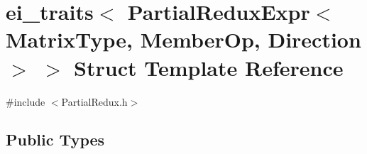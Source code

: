 \hypertarget{structei__traits_3_01_partial_redux_expr_3_01_matrix_type_00_01_member_op_00_01_direction_01_4_01_4}{\section{ei\-\_\-traits$<$ Partial\-Redux\-Expr$<$ Matrix\-Type, Member\-Op, Direction $>$ $>$ Struct Template Reference}
\label{structei__traits_3_01_partial_redux_expr_3_01_matrix_type_00_01_member_op_00_01_direction_01_4_01_4}
}


{\ttfamily \#include $<$Partial\-Redux.\-h$>$}

\subsection*{Public Types}
